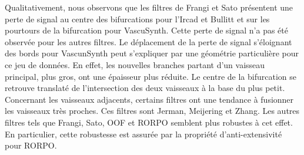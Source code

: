 Qualitativement, nous observons que les filtres de Frangi et Sato présentent une perte de signal au centre des bifurcations pour l'Ircad et Bullitt et sur les pourtours de la bifurcation pour VascuSynth. Cette perte de signal n'a pas été observée pour les autres filtres. Le déplacement de la perte de signal s'éloignant des bords pour VascunSynth peut s'expliquer par une géométrie particulière pour ce jeu de données. En effet, les nouvelles branches partant d'un vaisseau principal, plus gros, ont une épaisseur plus réduite. Le centre de la bifurcation se retrouve translaté de l'intersection des deux vaisseaux à la base du plus petit. Concernant les vaisseaux adjacents, certains filtres ont une tendance à fusionner les vaisseaux très proches. Ces filtres sont Jerman, Meijering et Zhang. Les autres filtres tels que Frangi, Sato, OOF et RORPO semblent plus robustes à cet effet. En particulier, cette robustesse est assurée par la propriété d'anti-extensivité pour RORPO.
\begin{table}[!ht]
  \caption{Résultats quantitatifs (moyenne $\pm$ écart-type) pour le masque des bifurcations \maskbif sur l'ensemble des jeux de données. Seul le Dice est exprimé car le MCC n'est pas défini sur ce masque.}
  \label{tab:dice_bif}
  \end{table}

